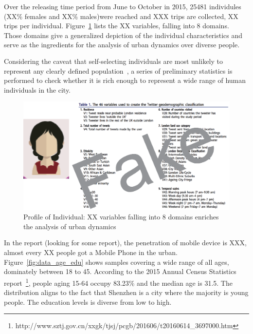 Over the releasing time period from June to October in 2015, 25481 individules (XX\% females and XX\% males)were reached and XXX trips are collected, XX trips per individual. Figure~\ref{fig:data_over} lists the XX variables, falling into 8 domains. Those domains give a generalized depiction of the individual characteristics and serve as the ingredients for the analysis of urban dynamics over diverse people. 

Considering the caveat that self-selecting individuals are most unlikely to represent any clearly defined population~\cite{Longley2015}, a series of preliminary statistics is performed to check whether it is rich enough to represent a wide range of human individuals in the city.


\begin{figure}[htb!]
 \centering %
 \includegraphics[width=\columnwidth]{pictures/data_over}
 \caption{Profile of Individual: XX variables falling into 8 domains enriches the analysis of urban dynamics}
 \label{fig:data_over}
\end{figure}

In the report (looking for some report), the penetration of mobile device is XXX, almost every XX people got a Mobile Phone in the urban. Figure~\ref{fig:data_age_edu} shows samples covering a wide range of all ages, dominately between 18 to 45. According to the 2015 Annual Census Statistics report~\footnote{http://www.sztj.gov.cn/xxgk/tjsj/pcgb/201606/t20160614\_3697000.htm}, people aging 15-64 occupy 83.23\% and the median age is 31.5. The distribution aligns to the fact that Shenzhen is a city where the majority is young people. The education levels is diverse from low to high. 



